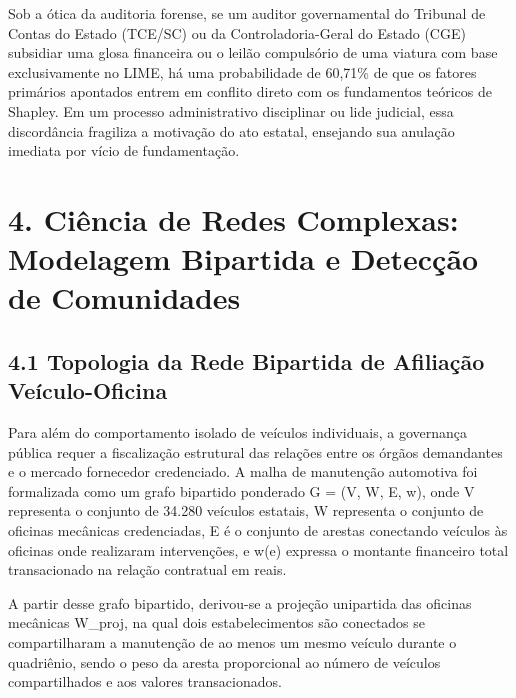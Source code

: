 \documentclass[10pt,a4paper,journal]{article}
\begin{document}
Sob a ótica da auditoria forense, se um auditor governamental do Tribunal de Contas do Estado (TCE/SC) ou da Controladoria-Geral do Estado (CGE) subsidiar uma glosa financeira ou o leilão compulsório de uma viatura com base exclusivamente no LIME, há uma probabilidade de 60,71\% de que os fatores primários apontados entrem em conflito direto com os fundamentos teóricos de Shapley. Em um processo administrativo disciplinar ou lide judicial, essa discordância fragiliza a motivação do ato estatal, ensejando sua anulação imediata por vício de fundamentação.

\section{4. Ciência de Redes Complexas: Modelagem Bipartida e Detecção de Comunidades}
\subsection{4.1 Topologia da Rede Bipartida de Afiliação Veículo-Oficina}
Para além do comportamento isolado de veículos individuais, a governança pública requer a fiscalização estrutural das relações entre os órgãos demandantes e o mercado fornecedor credenciado. A malha de manutenção automotiva foi formalizada como um grafo bipartido ponderado G = (V, W, E, w), onde V representa o conjunto de 34.280 veículos estatais, W representa o conjunto de oficinas mecânicas credenciadas, E é o conjunto de arestas conectando veículos às oficinas onde realizaram intervenções, e w(e) expressa o montante financeiro total transacionado na relação contratual em reais.

A partir desse grafo bipartido, derivou-se a projeção unipartida das oficinas mecânicas W\_proj, na qual dois estabelecimentos são conectados se compartilharam a manutenção de ao menos um mesmo veículo durante o quadriênio, sendo o peso da aresta proporcional ao número de veículos compartilhados e aos valores transacionados.
\end{document}
